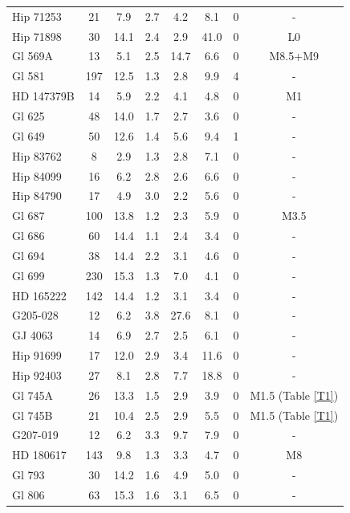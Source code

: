 \begin{landscape}
{\begin{longtable}{l|ccccccc}
Hip 71253  &  21 &   7.9 &   2.7 &   4.2 &   8.1 & 0 & -  \\ 
Hip 71898  &  30 &  14.1 &   2.4 &   2.9 &  41.0 & 0 & L0 \citep{Faherty09}  \\ 
Gl 569A &  13 &   5.1 &   2.5 &  14.7 &   6.6 & 0 & M8.5+M9 \citep{Mason01}  \\ 
Gl 581 & 197 &  12.5 &   1.3 &   2.8 &   9.9 & 4 & -  \\ 
HD 147379B &  14 &   5.9 &   2.2 &   4.1 &   4.8 & 0 & M1 \citep{Herbig07}  \\ 
Gl 625  &  48 &  14.0 &   1.7 &   2.7 &   3.6 & 0 & -  \\ 
Gl 649 &  50 &  12.6 &   1.4 &   5.6 &   9.4 & 1 & -  \\ 
Hip 83762  &   8 &   2.9 &   1.3 &   2.8 &   7.1 & 0 & -  \\ 
Hip 84099  &  16 &   6.2 &   2.8 &   2.6 &   6.6 & 0 & -  \\ 
Hip 84790  &  17 &   4.9 &   3.0 &   2.2 &   5.6 & 0 & -  \\ 
Gl 687 & 100 &  13.8 &   1.2 &   2.3 &   5.9 & 0 & M3.5 \citep{Jenkins09}  \\ 
Gl 686  &  60 &  14.4 &   1.1 &   2.4 &   3.4 & 0 & -  \\ 
Gl 694  &  38 &  14.4 &   2.2 &   3.1 &   4.6 & 0 & -  \\ 
Gl 699  & 230 &  15.3 &   1.3 &   7.0 &   4.1 & 0 & -  \\ 
HD 165222  & 142 &  14.4 &   1.2 &   3.1 &   3.4 & 0 & -  \\ 
G205-028  &  12 &   6.2 &   3.8 &  27.6 &   8.1 & 0 & -  \\ 
GJ 4063  &  14 &   6.9 &   2.7 &   2.5 &   6.1 & 0 & -  \\ 
Hip 91699 &  17 &  12.0 &   2.9 &   3.4 &  11.6 & 0 & -  \\ 
Hip 92403  &  27 &   8.1 &   2.8 &   7.7 &  18.8 & 0 & -  \\ 
Gl 745A &  26 &  13.3 &   1.5 &   2.9 &   3.9 & 0 & M1.5 (Table \ref{T1})  \\ 
Gl 745B &  21 &  10.4 &   2.5 &   2.9 &   5.5 & 0 & M1.5 (Table \ref{T1})  \\ 
G207-019  &  12 &   6.2 &   3.3 &   9.7 &   7.9 & 0 & -  \\ 
HD 180617 & 143 &   9.8 &   1.3 &   3.3 &   4.7 & 0 & M8 \citep{Jenkins09}  \\ 
Gl 793  &  30 &  14.2 &   1.6 &   4.9 &  5.0 & 0 & -  \\ 
Gl 806  &  63 &  15.3 &   1.6 &   3.1 &   6.5 & 0 & -  \\ 

\end{longtable}}
\end{landscape}
